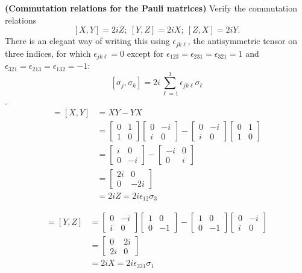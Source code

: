  \textbf{(Commutation relations for the Pauli matrices)} Verify the commutation relations $$[X, Y] = 2iZ;\ [Y, Z] = 2iX;\ [Z,X] = 2iY.$$ There is an elegant way of writing this using $\epsilon_{jk\ell}$, the antisymmetric tensor on three indices, for which $\epsilon_{jk\ell}=0$ except for $\epsilon_{123} = \epsilon_{231}=\epsilon_{321} = 1$ and $\epsilon_{321}=\epsilon_{213}=\epsilon_{132}=-1$: $$[\sigma_j,\sigma_k] = 2i\sum_{\ell=1}^3\epsilon_{jk\ell}\sigma_\ell$$.
\Soln
\begin{align*}
	[\sigma_1,\sigma_2] = \left[X, Y \right] &=XY - YX\\
		&= \begin{bmatrix}
		0 & 1 \\
		1 & 0
		\end{bmatrix}
		\begin{bmatrix}
		0 & -i \\
		i & 0
		\end{bmatrix}
		-
		\begin{bmatrix}
		0 & -i \\
		i & 0
		\end{bmatrix}
		\begin{bmatrix}
		0 & 1 \\
		1 & 0
		\end{bmatrix} \\
%
		&=
%
		\begin{bmatrix}
			i & 0 \\
			0 & -i
		\end{bmatrix}
		-
		\begin{bmatrix}
			-i & 0 \\
			0 & i
		\end{bmatrix}\\
%
		&=
%
		\begin{bmatrix}
			2i & 0 \\
			0 & -2i
		\end{bmatrix} \\
%
		&=	2i Z = 2i\epsilon_{12}\sigma_3
\end{align*}

\begin{align*}
	[\sigma_2,\sigma_3] = \left[Y, Z \right] &= \begin{bmatrix}
		0 & -i \\
		i & 0
	\end{bmatrix}
	\begin{bmatrix}
		1 & 0 \\
		0 & -1
	\end{bmatrix}
	-
	\begin{bmatrix}
		1 & 0 \\
		0 & -1
	\end{bmatrix}
	\begin{bmatrix}
		0 & -i \\
		i & 0
	\end{bmatrix}\\
	&=
	\begin{bmatrix}
		0 & 2i \\
		2i & 0
	\end{bmatrix}\\
	&= 2iX = 2i\epsilon_{231}\sigma_1
\end{align*}

